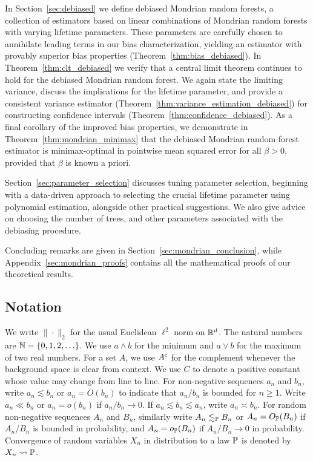 In Section~\ref{sec:debiased} we define debiased Mondrian random forests,
a collection of estimators
based on linear combinations of Mondrian random forests
with varying lifetime parameters.
These parameters are carefully chosen to annihilate leading terms
in our bias characterization,
yielding an estimator with provably superior bias properties
(Theorem~\ref{thm:bias_debiased}).
In Theorem~\ref{thm:clt_debiased} we verify that a central limit theorem
continues to hold for the debiased Mondrian random forest.
We again state the limiting variance,
discuss the implications for the lifetime parameter, and provide
a consistent variance estimator
(Theorem~\ref{thm:variance_estimation_debiased})
for constructing confidence intervals
(Theorem~\ref{thm:confidence_debiased}).
As a final corollary of the improved bias properties,
we demonstrate in Theorem~\ref{thm:mondrian_minimax} that the debiased Mondrian
random forest estimator is minimax-optimal in pointwise mean squared error
for all $\beta > 0$, provided that $\beta$ is known a priori.

Section~\ref{sec:parameter_selection} discusses tuning
parameter selection, beginning with a data-driven approach to
selecting the crucial lifetime parameter using polynomial estimation,
alongside other practical suggestions.
We also give advice on choosing the number of trees,
and other parameters associated with the debiasing procedure.

Concluding remarks are given in Section~\ref{sec:mondrian_conclusion},
while Appendix~\ref{sec:mondrian_proofs} contains all the mathematical
proofs of our theoretical results.

\subsection{Notation}

We write $\|\cdot\|_2$ for the usual Euclidean $\ell^2$ norm on $\R^d$.
The natural numbers are $\N = \{0, 1, 2, \ldots \}$.
We use $a \wedge b$ for the minimum and $a \vee b$ for the maximum
of two real numbers.
For a set $A$, we use $A^\c$ for the complement
whenever the background space is clear from context.
We use $C$ to denote a positive constant whose value may change
from line to line.
For non-negative sequences
$a_n$ and $b_n$, write
$a_n \lesssim b_n$ or $a_n = O(b_n)$
to indicate that
$a_n / b_n$ is bounded for $n\geq 1$.
Write $a_n \ll b_n$ or $a_n = o(b_n)$ if $a_n / b_n \to 0$.
If $a_n \lesssim b_n \lesssim a_n$,
write $a_n \asymp b_n$.
For random non-negative sequences
$A_n$ and $B_n$, similarly write
$A_n \lesssim_\P B_n$ or $A_n = O_\P(B_n)$ if
$A_n / B_n$ is bounded in probability,
and $A_n = o_\P(B_n)$ if $A_n / B_n \to 0$ in probability.
Convergence of random variables $X_n$ in distribution to a law $\P$
is denoted by $X_n \rightsquigarrow \P$.

